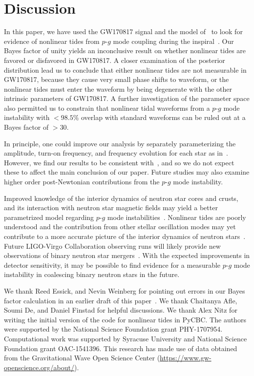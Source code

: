 \section{Discussion}
In this paper, we have used the GW170817 signal and the model of~\cite{Essick:2016tkn} to look for evidence of nonlinear tides from $p$-$g$ mode coupling during the inspiral~\citep{Weinberg:2013pbi,Weinberg:2015pxa,Zhou:2018tvc}. Our Bayes factor of unity yields an inconclusive result on whether nonlinear tides are favored or disfavored in GW170817. A closer examination of the posterior distribution lead us to conclude that either nonlinear tides are not measurable in GW170817, because they cause very small phase shifts to waveform, or the nonlinear tides must enter the waveform by being degenerate with the other intrinsic parameters of GW170817. A further investigation of the parameter space also permitted us to constrain that nonlinear tidal waveforms from a $p$-$g$ mode instability with $<98.5 \%$ overlap with standard waveforms can be ruled out at a Bayes factor of $>30$.

In principle, one could improve our analysis by separately parameterizing the amplitude, turn-on frequency, and frequency evolution for each star as in~\cite{abbott2019constraining}. However, we find our results to be consistent with~\cite{abbott2019constraining}, and so we do not expect these to affect the main conclusion of our paper. Future studies may also examine higher order post-Newtonian contributions from the $p$-$g$ mode instability.

Improved knowledge of the interior dynamics of neutron star cores and crusts, and its interaction with neutron star magnetic fields may yield a better parametrized model regarding $p$-$g$ mode instabilities~\citep{Weinberg:2015pxa}. Nonlinear tides are poorly understood and the contribution from other stellar oscillation modes may yet contribute to a more accurate picture of the interior dynamics of neutron stars~\citep{Andersson:2017iav}. Future LIGO-Virgo Collaboration observing runs will likely provide new observations of binary neutron star mergers~\citep{Abbott:2016ymx,ligo2018gwtc}. With the expected improvements in detector sensitivity, it may be possible to find evidence for a measurable $p$-$g$ mode instability in coalescing binary neutron stars in the future.


We thank Reed Essick, and Nevin Weinberg for pointing out errors in our Bayes factor calculation in an earlier draft of this paper~\citep{Essick:2018wvj}. We  thank Chaitanya Afle, Soumi De, and Daniel Finstad for helpful discussions. We thank Alex Nitz for writing the initial version of the code for nonlinear tides in PyCBC. The authors were supported by the National Science Foundation grant PHY-1707954. Computational work was supported by Syracuse University and National Science Foundation grant OAC-1541396. This research has made use of data obtained from the Gravitational Wave Open Science Center (\url{https://www.gw-openscience.org/about/}).


